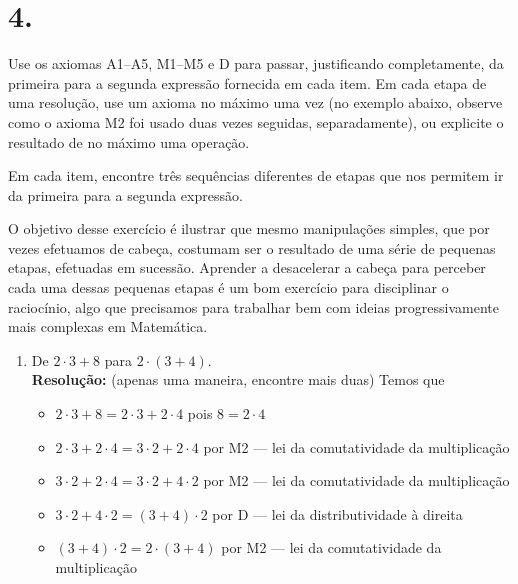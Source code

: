 \documentclass[12pt,a4paper]{article}
\begin{document}
\begin{enumerate}[label=(\alph*)]
\begin{enumerate}[label=(\alph*)]
    \end{enumerate}
    
    \vspace{1cm}
    
    \section*{4.}
    Use os axiomas A1–A5, M1–M5 e D para passar, justificando completamente, da primeira para a segunda expressão fornecida em cada item. Em cada etapa de uma resolução, use um axioma no máximo uma vez (no exemplo abaixo, observe como o axioma M2 foi usado duas vezes seguidas, separadamente), ou explicite o resultado de no máximo uma operação.
    
    Em cada item, encontre três sequências diferentes de etapas que nos permitem ir da primeira para a segunda expressão.
    
    O objetivo desse exercício é ilustrar que mesmo manipulações simples, que por vezes efetuamos de cabeça, costumam ser o resultado de uma série de pequenas etapas, efetuadas em sucessão. Aprender a desacelerar a cabeça para perceber cada uma dessas pequenas etapas é um bom exercício para disciplinar o raciocínio, algo que precisamos para trabalhar bem com ideias progressivamente mais complexas em Matemática.
    
    \begin{enumerate}[label=(\alph*)]
        \item De $2 \cdot 3 + 8$ para $2 \cdot (3 + 4)$.\\
    
        \textbf{Resolução:} (apenas uma maneira, encontre mais duas) Temos que
        \begin{itemize}
            \item $2 \cdot 3 + 8 = 2 \cdot 3 + 2 \cdot 4$ \hfill pois $8 = 2 \cdot 4$
            \item $2 \cdot 3 + 2 \cdot 4 = 3 \cdot 2 + 2 \cdot 4$ \hfill por M2 — lei da comutatividade da multiplicação
            \item $3 \cdot 2 + 2 \cdot 4 = 3 \cdot 2 + 4 \cdot 2$ \hfill por M2 — lei da comutatividade da multiplicação
            \item $3 \cdot 2 + 4 \cdot 2 = (3 + 4) \cdot 2$ \hfill por D — lei da distributividade à direita
            \item $(3 + 4) \cdot 2 = 2 \cdot (3 + 4)$ \hfill por M2 — lei da comutatividade da multiplicação
        \end{itemize}
    

\end{enumerate}
\end{enumerate}
\end{document}
